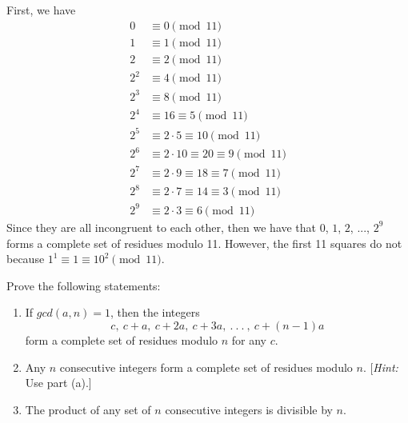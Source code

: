 \begin{solution}
    First, we have
    \begin{align*}
        0 &\equiv 0 \pmod{11} \\
        1 &\equiv 1 \pmod{11} \\
        2 &\equiv 2 \pmod{11} \\
        2^2 &\equiv 4 \pmod{11} \\
        2^3 &\equiv 8 \pmod{11} \\
        2^4 &\equiv 16 \equiv 5 \pmod{11} \\
        2^5 &\equiv 2\cdot 5 \equiv 10 \pmod{11} \\
        2^6 &\equiv 2\cdot 10 \equiv 20 \equiv 9 \pmod{11}  \\
        2^7 &\equiv 2\cdot 9 \equiv 18 \equiv 7 \pmod{11} \\
        2^8 &\equiv 2\cdot 7 \equiv 14 \equiv 3 \pmod{11} \\
        2^9 &\equiv 2\cdot 3 \equiv 6 \pmod{11} 
    \end{align*}
    Since they are all incongruent to each other, then we have that $0$, $1$, $2$, ..., $2^9$ forms a complete set of residues modulo 11. However, the first 11 squares do not because $1^1 \equiv 1 \equiv 10^2 \pmod{11}$.\\
\end{solution}

\begin{exercise}
    Prove the following statements:
    \begin{enumerate}
        \item If $gcd(a,n) = 1$, then the integers
        $$c, \ c+a, \ c+2a, \ c+3a, \ . \ . \ . \ , \ c+(n-1)a$$
        form a complete set of residues modulo $n$ for any $c$.
        \item Any $n$ consecutive integers form a complete set of residues modulo $n$. [\textit{Hint:} Use part (a).]
        \item The product of any set of $n$ consecutive integers is divisible by $n$.
    \end{enumerate}
\end{exercise}

